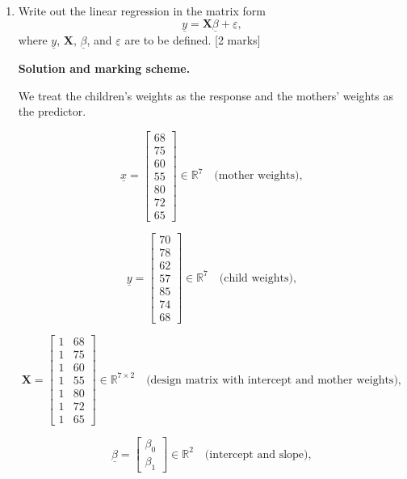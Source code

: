 \documentclass{article}
\begin{document}
\begin{enumerate}[label=(\alph*)]
    \item Write out the linear regression in the matrix form
    \[
    \underline{y} = \bm{X}\underline{\beta} + \underline{\varepsilon},
    \]
    where $\underline{y}$, $\bm{X}$, $\underline{\beta}$, and $\underline{\varepsilon}$ are to be defined. [2 marks]

    \begin{mdframed}[linecolor=black, linewidth=1pt]
    \textbf{Solution and marking scheme.}

    We treat the children's weights as the response and the mothers' weights as the predictor.

    \[
    \underline{x}
    =
    \begin{bmatrix}
    68 \\ 75 \\ 60 \\ 55 \\ 80 \\ 72 \\ 65
    \end{bmatrix}
    \in\mathbb{R}^7
    \quad\text{(mother weights)},
    \]
    
    \[
    \underline{y}
    =
    \begin{bmatrix}
    70\\ 78\\ 62\\ 57\\ 85\\ 74\\ 68
    \end{bmatrix}
    \in\mathbb{R}^7
    \quad\text{(child weights)},
    \]
    
    \[
    \bm{X}
    =
    \begin{bmatrix}
    1 & 68\\
    1 & 75\\
    1 & 60\\
    1 & 55\\
    1 & 80\\
    1 & 72\\
    1 & 65
    \end{bmatrix}
    \in\mathbb{R}^{7\times 2}
    \quad\text{(design matrix with intercept and mother weights)},
    \]
    
    \[
    \underline{\beta} =
    \begin{bmatrix}
    \beta_0\\
    \beta_1
    \end{bmatrix}
    \in\mathbb{R}^2
    \quad\text{(intercept and slope)},
    \]
    

\end{mdframed}
\end{enumerate}
\end{document}

